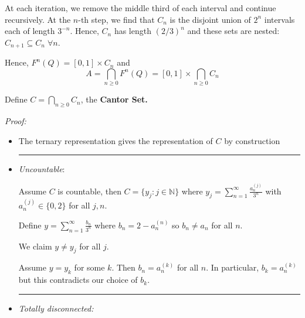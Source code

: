 \documentclass[12pt]{report}
\newcommand{\N}{\mathbb{N}}
\newcommand{\sub}{\subseteq}
\renewcommand{\div}{\vspace*{10pt}\hrule\vspace*{10pt}}
\newcommand*{\tbf}[1]{\ifmmode\mathbf{#1}\else\textbf{#1}\fi}
\newenvironment{tbox}[2][gray]{
    \begin{tcolorbox}[
        parbox=false,
        colback=#1!5!white,
        colframe=#1!75!black,
        breakable,
        title={#2}
    ]}
    {\end{tcolorbox}}
\begin{document}
At each iteration, we remove the middle third of each interval and continue recursively. At the $n$-th step, we find that $C_n$ is the disjoint union of $2^n$ intervals each of length $3^{-n}$. Hence, $C_n$ has length $(2/3)^n$ and these sets are nested: $C_{n+1} \sub C_n \;\forall n$.

Hence, $F^n(Q) = [0, 1] \times C_n$ and
\[A = \bigcap_{n \geq 0} F^n(Q) = [0, 1] \times \bigcap_{n \geq 0} C_n\]

Define $C = \bigcap_{n \geq 0} C_n$, the \tbf{Cantor Set.}

\begin{tbox}{\textbf{Theorem:} Let $C$ be a Cantor set. Then
        \begin{itemize}
            \item $C$ can be written as a ternary expansion
                  \[C = \left\{y = \sum_{n=1}^\infty \frac{a_n}{3^n}: a_n \in \{0, 2\}\right\}\]
            \item $C$ is uncountable
            \item $C$ is \emph{totally disconnected} (i.e. does not contain any non-empty open intervals)
            \item $C$ is \emph{perfect} (i.e. every point in $C$ is a limit point of $C$)
            \item $C$ is closed and bounded
        \end{itemize}
        a ternary expansion }
    \emph{Proof:}
    \begin{itemize}
        \item The ternary representation gives the representation of $C$ by construction

              \div
        \item \emph{Uncountable}:

              Assume $C$ is countable, then $C = \{y_j: j \in \N\}$ where $y_j = \sum_{n=1}^\infty \frac{a_n^{(j)}}{3^n}$ with $a_n^{(j)} \in \{0, 2\}$ for all $j, n$.

              Define $y = \sum_{n=1}^\infty \frac{b_n}{3^n}$ where $b_n = 2 - a_n^{(n)}$ so $b_n \neq a_n$ for all $n$.

              We claim $y \neq y_j$ for all $j$.

              Assume $y = y_k$ for some $k$. Then $b_n = a_n^{(k)}$ for all $n$. In particular, $b_k = a_n^{(k)}$ but this contradicts our choice of $b_k$.

              \div

        \item \emph{Totally disconnected:}


\end{itemize}
\end{tbox}
\end{document}
